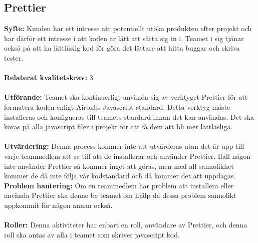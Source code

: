 \documentclass[10pt]{article}
\begin{document}
	
	
	\subsection{Prettier}
	\textbf{Syfte:}	Kunden har ett intresse att potentiellt utöka produkten efter projekt och har därför ett intresse i att koden är lätt att sätta sig in i. Teamet i sig tjänar också på att ha lättläslig kod för göra det lättare att hitta buggar och skriva tester.
	\\\\
	\textbf{Relaterat kvalitetskrav:} 3
	\\\\
	\textbf{Utförande:} Teamet ska kontinuerligt använda sig av verktyget Prettier för att formatera koden enligt Airbnbs Javascript standard. Detta verktyg måste installeras och konfigueras till teamets standard innan det kan användas. Det ska köras på alla javascript filer i projekt för att få dem att bli mer lättläsliga.
	\\\\
	\textbf{Utvärdering:} Denna process kommer inte att utvärderas utan det är upp till varje teammedlem att se till att de installerar och använder Prettier. Ifall någon inte använder Prettier så kommer inget att göras, men med all sannolikhet kommer de då inte följa vår kodstandard och då kommer det att uppdagas. 
	\textbf{Problem hantering:} Om en teammedlem har problem att installera eller använda Prettier ska denne be teamet om hjälp då dessa problem sannolikt uppkommit för någon annan också.
	\\\\
	\textbf{Roller:} Denna aktiviteter har enbart en roll, användare av Prettier, och denna roll ska antas av alla i teamet som skriver javascript kod.
	
	
\end{document}
